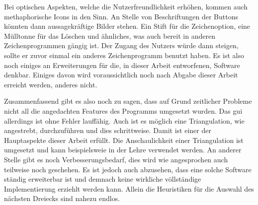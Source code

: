 Bei optischen Aspekten, welche die Nutzerfreundlichkeit erhöhen, kommen auch methaphorische Icons in den Sinn. An Stelle von Beschriftungen der Buttons könnten dann aussagekräftige Bilder stehen.
Ein Stift für die Zeichenoption, eine Mülltonne für das Löschen und ähnliches, was auch bereit in anderen Zeichenprogrammen gängig ist. Der Zugang des Nutzers würde dann steigen, sollte er zuvor einmal ein anderes Zeichenprogramm benutzt haben.
Es ist also noch einiges an Erweiterungen für die, in dieser Arbeit entworfenen, Software denkbar. Einiges davon wird voraussichtlich noch nach Abgabe dieser Arbeit erreicht werden, anderes nicht. \linebreak

Zusammenfassend gibt es also noch zu sagen, dass auf Grund zeitlicher Probleme nicht all die angedachten Features des Programms umgesetzt wurden. Das \ac{gui} allerdings ist ohne Fehler lauffähig.
Auch ist es möglich eine Triangulation, wie angestrebt, durchzuführen und dies schrittweise. Damit ist einer der Hauptaspekte dieser Arbeit erfüllt. Die Anschaulichkeit einer Triangulation ist umgesetzt und kann beispielsweie
in der Lehre verwendet werden.
An anderer Stelle gibt es noch Verbesserungsbedarf, dies wird wie angesprochen auch teilweise noch geschehen. Es ist jedoch auch abzusehen, dass eine solche Software ständig erweiterbar ist und demnach keine wirkliche völlständige Implementierung erziehlt 
werden kann. Allein die Heuristiken für die Auswahl des nächsten Dreiecks sind nahezu endlos. 